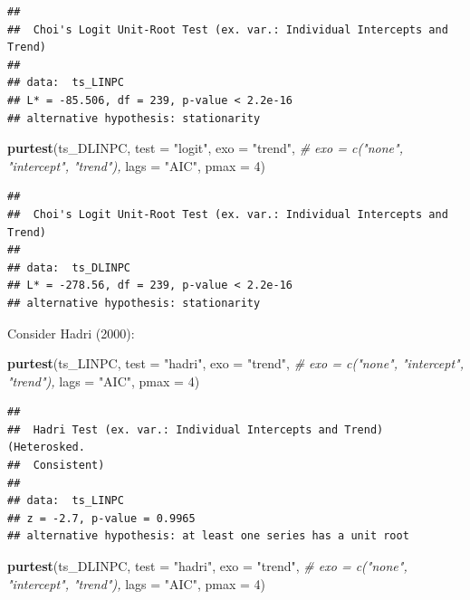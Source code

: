 \documentclass[
]{book}
\newenvironment{Shaded}{\begin{snugshade}}{\end{snugshade}}
\newcommand{\AttributeTok}[1]{\textcolor[rgb]{0.13,0.29,0.53}{#1}}
\newcommand{\CommentTok}[1]{\textcolor[rgb]{0.56,0.35,0.01}{\textit{#1}}}
\newcommand{\DecValTok}[1]{\textcolor[rgb]{0.00,0.00,0.81}{#1}}
\newcommand{\FunctionTok}[1]{\textcolor[rgb]{0.13,0.29,0.53}{\textbf{#1}}}
\newcommand{\NormalTok}[1]{#1}
\newcommand{\StringTok}[1]{\textcolor[rgb]{0.31,0.60,0.02}{#1}}
\begin{document}
\begin{verbatim}
## 
##  Choi's Logit Unit-Root Test (ex. var.: Individual Intercepts and Trend)
## 
## data:  ts_LINPC
## L* = -85.506, df = 239, p-value < 2.2e-16
## alternative hypothesis: stationarity
\end{verbatim}

\begin{Shaded}
\begin{Highlighting}[]
\FunctionTok{purtest}\NormalTok{(ts\_DLINPC, }\AttributeTok{test =} \StringTok{"logit"}\NormalTok{, }\AttributeTok{exo =} \StringTok{"trend"}\NormalTok{, }\CommentTok{\# exo = c("none", "intercept", "trend"),}
        \AttributeTok{lags =} \StringTok{"AIC"}\NormalTok{, }\AttributeTok{pmax =} \DecValTok{4}\NormalTok{)}
\end{Highlighting}
\end{Shaded}

\begin{verbatim}
## 
##  Choi's Logit Unit-Root Test (ex. var.: Individual Intercepts and Trend)
## 
## data:  ts_DLINPC
## L* = -278.56, df = 239, p-value < 2.2e-16
## alternative hypothesis: stationarity
\end{verbatim}

Consider Hadri (2000):

\begin{Shaded}
\begin{Highlighting}[]
\FunctionTok{purtest}\NormalTok{(ts\_LINPC, }\AttributeTok{test =} \StringTok{"hadri"}\NormalTok{, }\AttributeTok{exo =} \StringTok{"trend"}\NormalTok{, }\CommentTok{\# exo = c("none", "intercept", "trend"),}
        \AttributeTok{lags =} \StringTok{"AIC"}\NormalTok{, }\AttributeTok{pmax =} \DecValTok{4}\NormalTok{)}
\end{Highlighting}
\end{Shaded}

\begin{verbatim}
## 
##  Hadri Test (ex. var.: Individual Intercepts and Trend) (Heterosked.
##  Consistent)
## 
## data:  ts_LINPC
## z = -2.7, p-value = 0.9965
## alternative hypothesis: at least one series has a unit root
\end{verbatim}

\begin{Shaded}
\begin{Highlighting}[]
\FunctionTok{purtest}\NormalTok{(ts\_DLINPC, }\AttributeTok{test =} \StringTok{"hadri"}\NormalTok{, }\AttributeTok{exo =} \StringTok{"trend"}\NormalTok{, }\CommentTok{\# exo = c("none", "intercept", "trend"),}
        \AttributeTok{lags =} \StringTok{"AIC"}\NormalTok{, }\AttributeTok{pmax =} \DecValTok{4}\NormalTok{)}
\end{Highlighting}
\end{Shaded}
\end{document}
